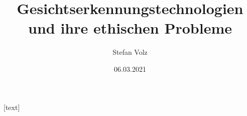 

\usepackage[german]{babel}
\usepackage{newunicodechar}
\usepackage[utf8]{inputenc}

\usepackage{subcaption}
\usepackage{adjustbox}
\usepackage{booktabs}
\usepackage[scale=2]{ccicons}

\usepackage{algorithm}
\usepackage[noend]{algpseudocode}
\makeatletter
\def\BState{\State\hskip-\ALG@thistlm}
\makeatother
%

\usepackage{multirow}
\usepackage[none]{hyphenat}
\usepackage{textcomp}
\usepackage{gensymb}
\sloppy


\usepackage{pgfplots}

\usepackage{xspace}
\newcommand{\themename}{\textbf{\textsc{metropolis}}\xspace}

\usepackage{graphicx}
\graphicspath{ {./img/} }

\usepackage{fancyhdr}

\usepackage[backend=biber, style=alphabetic]{biblatex}

[text] %

\usepackage{csquotes}
\usepackage{epigraph}

\newcommand\blfootnote[1]{
  \begingroup
  \renewcommand\thefootnote{}\footnote{#1}
  \addtocounter{footnote}{-1}
  \endgroup
}


\title{Gesichtserkennungstechnologien und ihre ethischen Probleme}
\subtitle{}
\date{06.03.2021}
\author{Stefan Volz}


\newcommand{\nologo}{\setbeamertemplate{logo}{}} %
\newcommand{\congress}{Gesichtserkennung}

\newcommand{\sourceCaption}[2]{{\caption*{\tiny{Quelle: #1}}\vspace*{-.5cm}
      \caption{#2}}}

